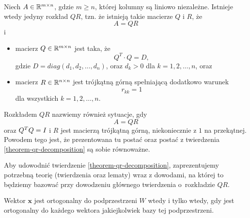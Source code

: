\documentclass[12pt,a4paper]{report}
\newcommand{\vr}[1]{\mathbf{#1}}
\newcommand{\mx}[1]{{#1}}
\begin{document}
\begin{theorem}[O rozkładzie QR]\label{theorem-qr-decomposition}
Niech $\mx{A} \in \setR^{m \times n}$, gdzie $m\ge n$, której kolumny są liniowo niezależne. Istnieje wtedy jedyny rozkład $\mx{QR}$, tzn. że istnieją takie macierze $\mx{Q}$ i $\mx{R}$, że
$$
\mx{A} = \mx{Q} \mx{R}
$$ 
i
\begin{itemize}
\item macierz $\mx{Q} \in \setR^{m \times n} $ jest taka, że 
$$
Q^{T}\cdot Q=D,
$$
gdzie $D= diag (d_{1}, d_{2}, ..., d_{n})$, oraz $d_{k}>0$ dla $k = 1, 2, \ldots, n$, oraz
\item macierz $\mx{R} \in \setR^{n \times n}$ jest trójkątną górną spełniającą dodatkowo warunek 
$$
r_{kk}= 1 
$$ 
dla wszystkich $k = 1, 2, \ldots, n$.
\end{itemize} 
\end{theorem}

\begin{remark}
Rozkładem $\mx{QR}$ nazwiemy również sytuacje, gdy 
$$
\mx{A}=\mx{Q}\mx{R}
$$
oraz $\transpose{\mx{Q}}\mx{Q}=\mx{I}$ i $\mx{R}$ jest macierzą trójkątną górną, niekoniecznie z $1$ na przekątnej. Powodem tego jest, że prezentowana tu postać oraz postać z twierdzenia \ref{theorem-qr-decomposition} są sobie równoważne.  
\end{remark}

Aby udowodnić twierdzenie \ref{theorem-qr-decomposition}, zaprezentujemy potrzebną teorię (twierdzenia oraz lematy) wraz z dowodami, na której to będziemy bazować przy dowodzeniu głównego twierdzenia o~rozkładzie $QR$. 

\begin{theorem}
Wektor $\vr{x}$ jest ortogonalny do podprzestrzeni $W$ wtedy i tylko wtedy, gdy jest ortogonalny do każdego wektora jakiejkolwiek bazy tej podprzestrzeni.
\end{theorem}
\end{document}
